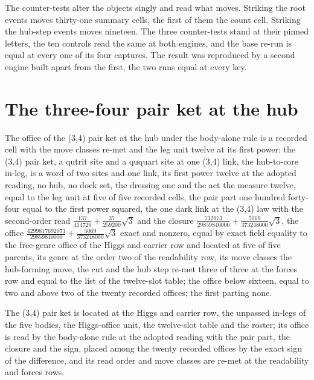 \begin{chproof}[census]
The counter-tests alter the objects singly and read what moves. Striking the root events moves thirty-one summary cells, the first of them the count cell. Striking the hub-step events moves nineteen. The three counter-tests stand at their pinned letters, the ten controls read the same at both engines, and the base re-run is equal at every one of its four captures. The result was reproduced by a second engine built apart from the first, the two runs equal at every key.
\end{chproof}
\section{The three-four pair ket at the hub}\label{mod:II-1-D541352-tfpk-t1}
\begin{chtheorem}\label{box:II-1-D541352-tfpk-t1:1}
The office of the (3,4) pair ket at the hub under the body-alone rule is a recorded cell with the move classes re-met and the leg unit twelve at its first power: the (3,4) pair ket, a qutrit site and a ququart site at one (3,4) link, the hub-to-core in-leg, is a word of two sites and one link, its first power twelve at the adopted reading, no hub, no dock set, the dressing one and the act the measure twelve, equal to the leg unit at five of five recorded cells, the pair part one hundred forty-four equal to the first power squared, the one dark link at the (3,4) law with the second-order read $\tfrac{137}{414720} + \tfrac{37}{259200}\sqrt{3}$ and the closure $\tfrac{732073}{29859840000} + \tfrac{5069}{373248000}\sqrt{3}$, the office $\tfrac{4299817692073}{29859840000} + \tfrac{5069}{373248000}\sqrt{3}$ exact and nonzero, equal by exact field equality to the free-genre office of the Higgs and carrier row and located at five of five parents, its genre at the order two of the readability row, its move classes the hub-forming move, the cut and the hub step re-met three of three at the forces row and equal to the list of the twelve-slot table; the office below sixteen, equal to two and above two of the twenty recorded offices; the first parting none.
\end{chtheorem}
The (3,4) pair ket is located at the Higgs and carrier row, the unpassed in-legs of the five bodies, the Higgs-office unit, the twelve-slot table and the roster; its office is read by the body-alone rule at the adopted reading with the pair part, the closure and the sign, placed among the twenty recorded offices by the exact sign of the difference, and its read order and move classes are re-met at the readability and forces rows.

